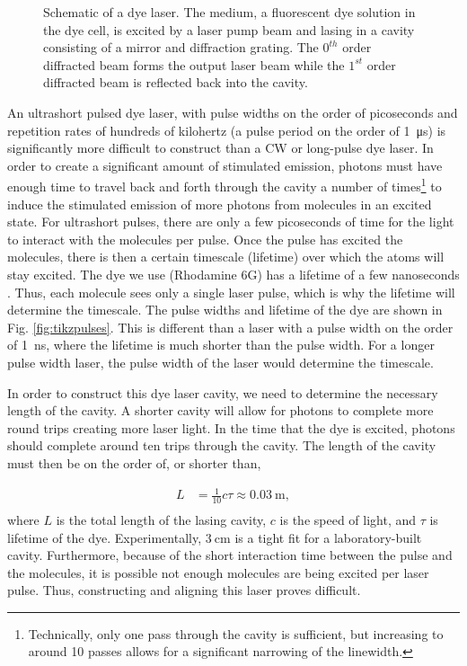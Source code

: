 \begin{figure}[ht]
	
  \caption{Schematic of a dye laser. The medium, a fluorescent dye solution in the dye cell, is excited by a laser pump beam and lasing in a cavity consisting of a mirror and diffraction grating. The $0^{th}$ order diffracted beam forms the output laser beam while the $1^{st}$ order diffracted beam is reflected back into the cavity.}
  \label{fig:dyelaser}
\end{figure}


An ultrashort pulsed dye laser, with pulse widths on the order of picoseconds and repetition rates of hundreds of kilohertz (a pulse period on the order of \SI{1}{\micro \second}) is significantly more difficult to construct than a CW or long-pulse dye laser. In order to create a significant amount of stimulated emission, photons must have enough time to travel back and forth through the cavity a number of times\footnote{Technically, only one pass through the cavity is sufficient, but increasing to around 10 passes allows for a significant narrowing of the linewidth.} to induce the stimulated emission of more photons from molecules in an excited state. For ultrashort pulses, there are only a few picoseconds of time for the light to interact with the molecules per pulse. Once the pulse has excited the molecules, there is then a certain timescale (lifetime) over which the atoms will stay excited. The dye we use (Rhodamine 6G) has a lifetime of a few nanoseconds \cite{Selanger1977}. Thus, each molecule sees only a single laser pulse, which is why the lifetime will determine the timescale. The pulse widths and lifetime of the dye are shown in Fig. \ref{fig:tikzpulses}. This is different than a laser with a pulse width on the order of \SI{1}{\nano \second}, where the lifetime is much shorter than the pulse width. For a longer pulse width laser, the pulse width of the laser would determine the timescale.

In order to construct this dye laser cavity, we need to determine the necessary length of the cavity. A shorter cavity will allow for photons to complete more round trips creating more laser light. In the time that the dye is excited, photons should complete around ten trips through the cavity. The length of the cavity must then be on the order of, or shorter than,

\begin{equation}
  \begin{split}
  L & = \frac{1}{10} c \tau  \approx \SI{0.03}{\meter},\\
\end{split}
  \label{cavitylength}
\end{equation}
%
where $L$ is the total length of the lasing cavity, $c$ is the speed of light, and $\tau$ is lifetime of the dye. Experimentally, $\SI{3}{\centi\meter}$ is a tight fit for a laboratory-built cavity. Furthermore, because of the short interaction time between the pulse and the molecules, it is possible not enough molecules are being excited per laser pulse. Thus, constructing and aligning this laser proves difficult.

